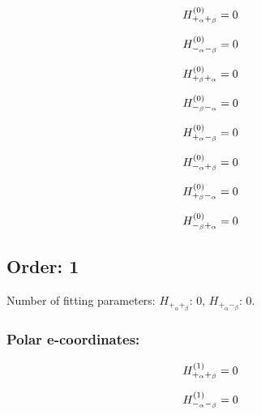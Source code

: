 \documentclass[fleqn]{article}
\begin{document}
\begin{dmath*}
H_{+_{\alpha}+_{\beta}}^{(0)}=0\\
\end{dmath*}

\begin{dmath*}
H_{-_{\alpha}-_{\beta}}^{(0)}=0\\
\end{dmath*}

\begin{dmath*}
H_{+_{\beta}+_{\alpha}}^{(0)}=0\\
\end{dmath*}

\begin{dmath*}
H_{-_{\beta}-_{\alpha}}^{(0)}=0\\
\end{dmath*}

\begin{dmath*}
H_{+_{\alpha}-_{\beta}}^{(0)}=0\\
\end{dmath*}

\begin{dmath*}
H_{-_{\alpha}+_{\beta}}^{(0)}=0\\
\end{dmath*}

\begin{dmath*}
H_{+_{\beta}-_{\alpha}}^{(0)}=0\\
\end{dmath*}

\begin{dmath*}
H_{-_{\beta}+_{\alpha}}^{(0)}=0\\
\end{dmath*}
\subsection{Order: 1}
Number of fitting parameters: $H_{+_{\alpha}+_{\beta}}$: $0$, $H_{+_{\alpha}-_{\beta}}$: $0$.
\subsubsection*{Polar e-coordinates:}

\begin{dmath*}
H_{+_{\alpha}+_{\beta}}^{(1)}=0\\
\end{dmath*}

\begin{dmath*}
H_{-_{\alpha}-_{\beta}}^{(1)}=0\\
\end{dmath*}
\end{document}
